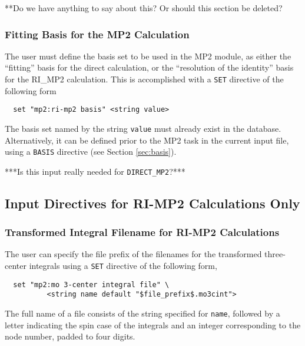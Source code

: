 \Large
**Do we have anything to say about this?  Or should this section be deleted?
\normalsize

\subsubsection{Fitting Basis for the MP2 Calculation}

The user must define the basis set to be used in the MP2 module, as
either the ``fitting'' basis for the direct calculation, or the ``resolution
of the identity'' basis for the RI\_MP2 calculation.  This is accomplished
with a \verb+SET+ directive of the following form

\begin{verbatim}
  set "mp2:ri-mp2 basis" <string value>
\end{verbatim}

The basis set named by the string \verb+value+ must already exist in the
database.  Alternatively, it can be defined prior to the MP2 task 
in the current input file, using a \verb+BASIS+ directive 
(see Section \ref{sec:basis}).

\Large
***Is this input really needed for \verb+DIRECT_MP2+?***
\normalsize


\subsection{Input Directives for RI-MP2 Calculations Only}

\subsubsection{Transformed Integral Filename for RI-MP2 Calculations}

The user can specify the file prefix of the filenames for the transformed
three-center integrals using a \verb+SET+ directive of the following form,

\begin{verbatim}
  set "mp2:mo 3-center integral file" \
          <string name default "$file_prefix$.mo3cint">
\end{verbatim}

The full name of a file consists of the string specified for \verb+name+,
followed by a letter indicating the spin case of the integrals and an 
integer corresponding to the node number, padded to four digits.

